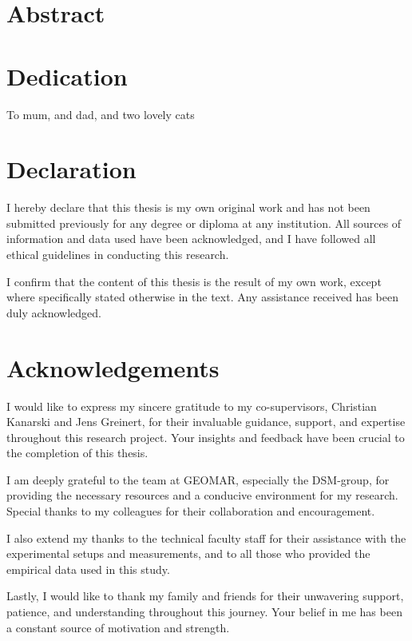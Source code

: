 \documentclass[a4paper,11pt]{report}
\begin{document}
\newpage

\chapter*{Abstract}



\newpage

\chapter*{Dedication}
To mum, and dad, and two lovely cats

\chapter*{Declaration}

I hereby declare that this thesis is my own original work and has not been submitted previously for any degree or diploma at any institution. All sources of information and data used have been acknowledged, and I have followed all ethical guidelines in conducting this research.

I confirm that the content of this thesis is the result of my own work, except where specifically stated otherwise in the text. Any assistance received has been duly acknowledged.

\chapter*{Acknowledgements}
I would like to express my sincere gratitude to my co-supervisors, Christian Kanarski and Jens Greinert, for their invaluable guidance, support, and expertise throughout this research project. Your insights and feedback have been crucial to the completion of this thesis.

I am deeply grateful to the team at GEOMAR, especially the DSM-group, for providing the necessary resources and a conducive environment for my research. Special thanks to my colleagues for their collaboration and encouragement.

I also extend my thanks to the technical faculty staff for their assistance with the experimental setups and measurements, and to all those who provided the empirical data used in this study.

Lastly, I would like to thank my family and friends for their unwavering support, patience, and understanding throughout this journey. Your belief in me has been a constant source of motivation and strength.
\end{document}
